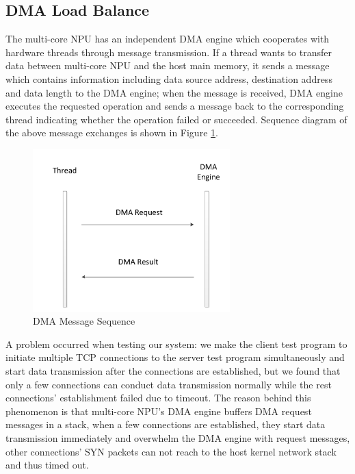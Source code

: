\documentclass[conference]{IEEEtran}
\begin{document}
\subsection{DMA Load Balance}
The multi-core NPU has an independent DMA engine which cooperates with hardware threads through message transmission. If a thread wants to transfer data between multi-core NPU and the host main memory, it sends a message which contains information including data source address, destination address and data length to the DMA engine; when the message is received, DMA engine executes the requested operation and sends a message back to the corresponding thread indicating whether the operation failed or succeeded. Sequence diagram of the above message exchanges is shown in Figure \ref{dma msg seq}.
\begin{figure}[!t]
\centering
\includegraphics[width=3.0in]{dma_msg_seq}
\caption{DMA Message Sequence}
\label{dma msg seq}
\end{figure}

A problem occurred when testing our system: we make the client test program to initiate multiple TCP connections to the server test program simultaneously and start data transmission after the connections are established, but we found that only a few connections can conduct data transmission normally while the rest connections' establishment failed due to timeout. The reason behind this phenomenon is that multi-core NPU's DMA engine buffers DMA request messages in a stack, when a few connections are established, they start data transmission immediately and overwhelm the DMA engine with request messages, other connections' SYN packets can not reach to the host kernel network stack and thus timed out.
\end{document}
